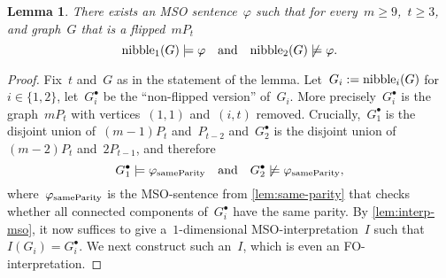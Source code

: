 \documentclass[11pt]{article}      \usepackage[margin=1in]{geometry}  \usepackage{microtype}
\newtheorem{lemma}[theorem]{Lemma}
\theoremstyle{definition}
\renewcommand{\phi}{\varphi}
\renewcommand{\ge}{\geqslant}
\renewcommand{\geq}{\ge}
\begin{document}
\begin{lemma}\label{lem:sep-tpt-sentence}
    There exists an MSO sentence~$\phi$ such that for every~$m \geq 9$,~$t \geq 3$, and graph~$G$ that is a flipped~$mP_t$
    \[
        \nibble_1(G) \models \phi \quad\text{and}\quad \nibble_2(G) \not \models \phi.
    \]
\end{lemma}
\begin{proof}
    Fix~$t$ and~$G$ as in the statement of the lemma. 
    Let~$G_i := \mathrm{nibble}_i(G)$ for~$i\in\{1,2\}$, let~$G^\bullet_i$ be the ``non-flipped version'' of~$G_i$. More precisely~$G^\bullet_i$ is the graph~$mP_t$ with vertices~$(1,1)$ and~$(i,t)$ removed.
    Crucially,~$G^\bullet_1$ is the disjoint union of~$(m-1)P_t$ and~$P_{t-2}$ and~$G^\bullet_2$ is the disjoint union of~$(m-2)P_t$ and~$2P_{t-1}$, and therefore
    \[
        G^\bullet_1 \models \sameparity 
        \quad\text{and}\quad
        G^\bullet_2 \not\models \sameparity,
    \]
    where~$\sameparity$ is the MSO-sentence from \cref{lem:same-parity} that checks whether all connected components of~$G_i^\bullet$ have the same parity.
    By \cref{lem:interp-mso}, it now suffices to give a~$1$-dimensional MSO-interpretation~$I$ such that~$I(G_i) = G_i^\bullet$.
    We next construct such an~$I$, which is even an FO-interpretation.


\end{proof}
\end{document}
